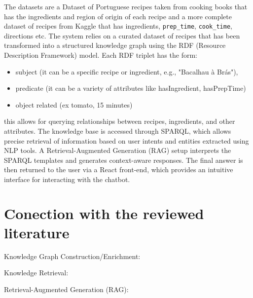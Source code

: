 \documentclass{article}
\begin{document}
The datasets are a Dataset of Portuguese recipes taken from cooking books that has the ingredients and region of origin of each recipe and a more complete dataset of recipes
from Kaggle that has ingredients, \texttt{prep\_time}, \texttt{cook\_time}, directions etc.
The system relies on a curated dataset of recipes that has been transformed into a structured knowledge graph using the RDF (Resource Description Framework) model. 
Each RDF triplet has the form:
\begin{itemize}
    \item subject (it can be a specific recipe or ingredient, e.g., "Bacalhau à Brás"),
    \item predicate (it can be a variety of attributes like hasIngredient, hasPrepTime)
    \item object related (ex tomato, 15 minutes) 
\end{itemize}
this allows for querying relationships between recipes, ingredients, and other attributes.
The knowledge base is accessed through SPARQL, which allows precise retrieval of information based on user intents and entities extracted using NLP tools.
A Retrieval-Augmented Generation (RAG) setup interprets the SPARQL templates and generates context-aware responses.
The final answer is then returned to the user via a React front-end, which provides an intuitive interface for interacting with the chatbot.



\section{Conection with the reviewed literature}

Knowledge Graph Construction/Enrichment: 

Knowledge Retrieval:

Retrieval-Augmented Generation (RAG):
\end{document}

